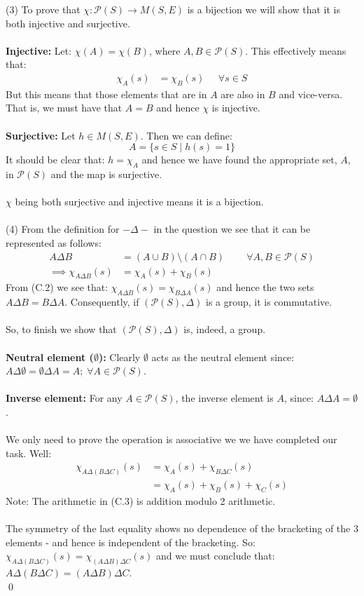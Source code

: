 \documentclass[12pt,a4paper]{article}
\begin{document}
\newpage
\noindent
(3) To prove that $\chi:\mathcal{P}(S) \to M(S,E)$ is a bijection we will show that it is both injective and surjective.\\
\\
\textbf{Injective:} Let: $\chi(A) = \chi(B)$, where $A,B \in \mathcal{P}(S)$.  This effectively means that:
\begin{align*}
    \chi_A(s) &= \chi_B(s) \;\;\;\;\; \forall s \in S
\end{align*}
But this means that those elements that are in $A$ are also in $B$ and vice-versa.  That is, we must have that $A=B$ and hence $\chi$
is injective.\\
\\
\textbf{Surjective:} Let $h \in M(S,E)$.  Then we can define:
$$ A = \{s \in S \mid h(s) = 1 \}$$
It should be clear that: $h = \chi_A$ and hence we have found the appropriate set, $A$, in $\mathcal{P}(S)$ and the map is surjective.\\
\\
$\chi$ being both surjective and injective means it is a bijection.\\
\\
(4) From the definition for $- \Delta -$ in the question we see that it can be represented as follows:
\begin{align*}
  A \Delta B &= (A \cup B) \setminus (A \cap B) \;\;\;\;\;\;\;\; \forall A, B \in \mathcal{P}(S) \\
\implies \chi_{A \Delta B}(s) &= \chi_{A}(s) + \chi_{B}(s) \tag{C.2}
\end{align*}
From (C.2) we see that: $\chi_{A \Delta B}(s) = \chi_{B \Delta A}(s)$ and hence the two sets $A \Delta B = B \Delta A$.  Consequently, if $(\mathcal{P}(S), \Delta)$ is a group,
it is commutative.\\
\\
So, to finish we show that $(\mathcal{P}(S), \Delta)$ is, indeed, a group.\\
\\
\textbf{Neutral element ($\emptyset$):} Clearly $\emptyset$ acts as the neutral element since: $A \Delta \emptyset = \emptyset \Delta A = A; \; \forall A \in \mathcal{P}(S)$.\\
\\
\textbf{Inverse element:} For any $A \in \mathcal{P}(S)$, the inverse element is $A$, since: $A \Delta A = \emptyset$.\\
\\
We only need to prove the operation is associative we we have completed our task.  Well:
\begin{align*}
  \chi_{A \Delta (B \Delta C)}(s) &= \chi_{A}(s) + \chi_{B \Delta C}(s) \\
  &= \chi_{A}(s) + \chi_{B}(s) + \chi_{C}(s) \tag{C.3}
\end{align*}
Note: The arithmetic in (C.3) is addition modulo 2 arithmetic.\\
\\
The symmetry of the last equality shows no dependence of the bracketing of the 3 elements - and hence is independent of the bracketing.  So:
$\chi_{A \Delta (B \Delta C)}(s) = \chi_{(A \Delta B) \Delta C}(s)$ and we must conclude that: $A \Delta (B \Delta C) = (A \Delta B) \Delta C$.\\
\qed
\end{document}
